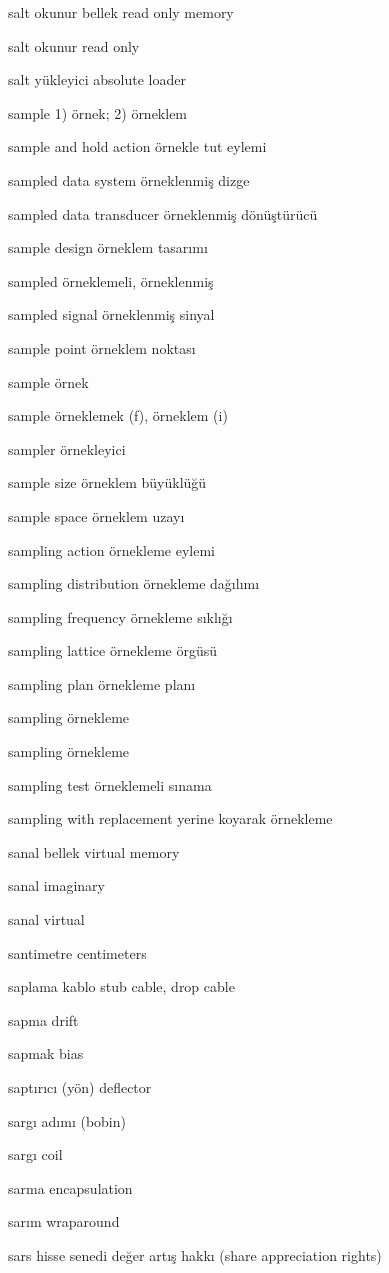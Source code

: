 \documentclass[12pt,fleqn]{article}\usepackage{../../common}
\begin{document}
salt okunur bellek read only memory

salt okunur read only

salt yükleyici absolute loader

sample 1) örnek; 2) örneklem

sample and hold action örnekle tut eylemi

sampled data system örneklenmiş dizge

sampled data transducer örneklenmiş dönüştürücü

sample design örneklem tasarımı

sampled örneklemeli, örneklenmiş

sampled signal örneklenmiş sinyal

sample point örneklem noktası

sample örnek

sample örneklemek (f), örneklem (i)

sampler örnekleyici

sample size örneklem büyüklüğü

sample space örneklem uzayı

sampling action örnekleme eylemi

sampling distribution örnekleme dağılımı

sampling frequency örnekleme sıklığı

sampling lattice örnekleme örgüsü

sampling plan örnekleme planı

sampling örnekleme

sampling örnekleme

sampling test örneklemeli sınama

sampling with replacement yerine koyarak örnekleme

sanal bellek virtual memory

sanal imaginary

sanal virtual

santimetre centimeters

saplama kablo stub cable, drop cable

sapma drift

sapmak bias

saptırıcı (yön) deflector

sargı adımı (bobin)

sargı coil

sarma encapsulation

sarım wraparound

sars hisse senedi değer artış hakkı (share appreciation rights)
\end{document}
